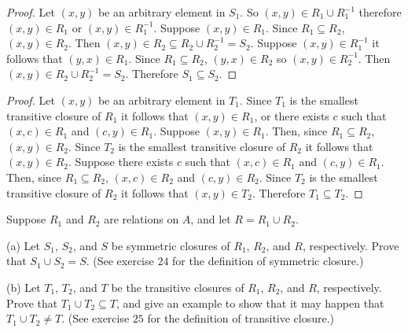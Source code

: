 \begin{proof}
    Let $(x, y)$ be an arbitrary element in $S_1$.
    So $(x, y) \in R_1 \cup R_1^{-1}$ therefore $(x, y) \in R_1$ or $(x, y) \in R_1^{-1}$.
    Suppose $(x, y) \in R_1$. Since $R_1 \subseteq R_2$, $(x, y) \in R_2$.
    Then $(x, y) \in R_2 \subseteq R_2 \cup R_2^{-1} = S_2$.
    Suppose $(x, y) \in R_1^{-1}$ it follows that $(y, x) \in R_1$.
    Since $R_1 \subseteq R_2$, $(y, x) \in R_2$ so $(x, y) \in R_2^{-1}$.
    Then $(x, y) \in R_2 \cup R_2^{-1} = S_2$.
    Therefore $S_1 \subseteq S_2$.
\end{proof}

\begin{proof}
    Let $(x, y)$ be an arbitrary element in $T_1$.
    Since $T_1$ is the smallest transitive closure of $R_1$
        it follows that $(x, y) \in R_1$, or there exists $c$ such that $(x, c) \in R_1$ and $(c, y) \in R_1$.
    Suppose $(x, y) \in R_1$.
    Then, since $R_1 \subseteq R_2$, $(x, y) \in R_2$.
    Since $T_2$ is the smallest transitive closure of $R_2$
        it follows that $(x, y) \in R_2$.
    Suppose there exists $c$ such that $(x, c) \in R_1$ and $(c, y) \in R_1$.
    Then, since $R_1 \subseteq R_2$, $(x, c) \in R_2$ and $(c, y) \in R_2$.
    Since $T_2$ is the smallest transitive closure of $R_2$
        it follows that $(x, y) \in T_2$.
    Therefore $T_1 \subseteq T_2$.
\end{proof}

\begin{tcolorbox}[title=Problem 27, breakable]
    Suppose $R_1$ and $R_2$ are relations on $A$, and let $R = R_1 \cup R_2$.

    (a) Let $S_1$, $S_2$, and $S$ be symmetric closures of $R_1$, $R_2$, and $R$,
        respectively. Prove that $S_1 \cup S_2 = S$. (See exercise $24$ for the definition
        of symmetric closure.)

    (b) Let $T_1$, $T_2$, and $T$ be the transitive closures of $R_1$, $R_2$, and $R$,
        respectively. Prove that $T_1 \cup T_2 \subseteq T$, and give an example to 
        show that it may happen that $T_1 \cup T_2 \not= T$. (See exercise $25$ for 
        the definition of transitive closure.)
\end{tcolorbox}

